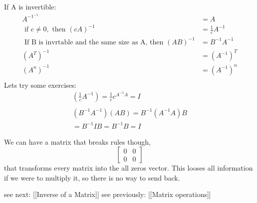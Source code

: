 If A is invertible:
$$
\begin{align}
A^{-1^{-1}} &= A \\
\text{ if } c \neq 0,\text{ then } (cA)^{-1} &= \frac{1}{c}A^{-1} \\
\text{ If B is invrtable and the same size as A, then } (AB)^{-1}&=B^{-1}A^{-1} \\
(A^{T})^{-1}&=(A^{-1})^{T} \\
(A^{n})^{-1}&=(A^{-1})^{n} \\
\end{align}
$$
Lets try some exercises:
$$
\begin{align}
\left( \frac{1}{c}A^{-1} \right) = \frac{1}{c}c^{A^{-1}A}=I \\ \\

(B^{-1}A^{-1})(AB) = B^{-1}(A^{-1}A)B \\
=B^{-1}IB = B^{-1}B = I
\end{align}
$$


We can have a matrix that breaks rules though, $$
\begin{bmatrix}
0 & 0 \\
0 & 0
\end{bmatrix}
$$
that transforms every matrix into the all zeros vector. This looses all information if we were to multiply it, so there is no way to send back. 

see next: [[Inverse of a Matrix]]
see previously: [[Matrix operations]]
